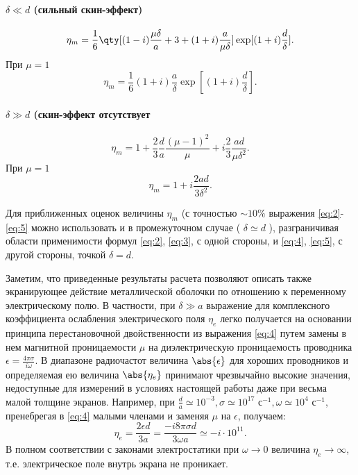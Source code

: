 \paragraph{$\delta\ll d$ (сильный скин-эффект)}%
\begin{equation}
    \label{eq:2}
    \eta_m= \frac{1}{6} \qty[ (1-i) \frac{\mu \delta}{a} + 3 + (1+i) \frac{a}{\mu \delta}]
    \exp[(1+i) \frac{d}{\delta}].
\end{equation}
При $\mu=1$ 
\begin{equation}
    \label{eq:3}
    \eta_m = \frac{1}{6} (1+i) \frac{a}{\delta} \exp[(1+i) \frac{d}{\delta}].
\end{equation}
\paragraph{$\delta\gg d$ (скин-эффект отсутствует}%
\begin{equation}
    \label{eq:4}
    \eta_m = 1 + \frac{2}{3 } \frac{d}{a} \frac{(\mu-1)^2}{\mu} + i \frac{2}{3} \frac{ad}{\mu\delta^2}.
\end{equation}
При $\mu=1$ 
\begin{equation}
    \label{eq:5}
    \eta_m = 1 + i \frac{2ad}{3\delta^2}.
\end{equation}

Для приближенных оценок величины $\eta_m$ (с точностью $\sim 10 \%$ выражения  
\eqref{eq:2}- \eqref{eq:5} можно использовать и в промежуточном случае ( $\delta\simeq d$ ), разграничивая области применимости формул \eqref{eq:2}, \eqref{eq:3}, с одной стороны,
и \eqref{eq:4}, \eqref{eq:5}, с другой стороны, точкой $\delta=d$.

Заметим, что приведенные результаты расчета позволяют описать также экранирующее действие металлической оболочки по отношению к переменному электрическому полю. В частности, при $\delta \gg a$ выражение для комплексного коэффициента ослабления электрического поля $\eta_e$ легко получается на основании принципа перестановочной двойственности из выражения \eqref{eq:4} путем замены в нем магнитной проницаемости $\mu$ на диэлектрическую проницаемость проводника $\epsilon = \frac{4 \pi \sigma}{i \omega}$. В диапазоне радиочастот величина $\abs{\epsilon}$ для хороших проводников и определяемая ею величина $\abs{\eta_e}$ принимают чрезвычайно высокие значения, недоступные для измерений в условиях настоящей работы даже при весьма малой толщине экранов. Например, при $\frac{d}{a}\simeq 10^{-3},\sigma \simeq 10^{17} \text{ с}^{-1}, \omega\simeq 10^{4} \text{ с}^{-1}$, пренебрегая в \eqref{eq:4} малыми членами и заменяя $\mu$ на $\epsilon$,
получаем:
\begin{equation}
    \label{eq:6}
    \eta_e = \frac{2\epsilon d}{3a} = \frac{-i {8} \pi \sigma d}{3\omega a} \simeq  - i \cdot 10^{11}.
\end{equation}
В полном соответствии с законами электростатики при $ \omega \to 0$ величина $\eta_e \to \infty$, т.е. электрическое поле внутрь экрана не проникает.

